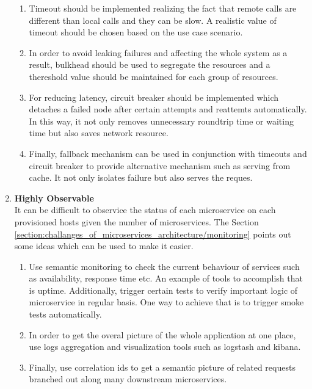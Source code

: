 \begin{enumerate}
\begin{enumerate}
\item Timeout should be implemented realizing the fact that remote calls are different than local calls and they can be slow. A realistic value of timeout should be chosen based on the use case scenario.
\item In order to avoid leaking failures and affecting the whole system as a result, bulkhead should be used to segregate the resources and a thereshold value should be maintained for each group of resources.
\item For reducing latency, circuit breaker should be implemented which detaches a failed node after certain attempts and reattemts automatically. In this way, it not only removes unnecessary roundtrip time or waiting time but also saves network resource.
\item Finally, fallback mechanism can be used in conjunction with timeouts and circuit breaker to provide alternative mechanism such as serving from cache. It not only isolates failure but also serves the reques.
\end{enumerate}
\item \textbf{Highly Observable} \\
It can be difficult to observice the status of each microservice on each provisioned hosts given the number of microservices. The Section \ref{section:challanges_of_microservices_architecture/monitoring} points out some ideas which can be used to make it easier.
\begin{enumerate}
\item Use semantic monitoring to check the current behaviour of services such as availability, response time etc. An example of tools to accomplish that is uptime. Additionally, trigger certain tests to verify important logic of microservice in regular basis. One way to achieve that is to trigger smoke tests automatically.
\item In order to get the overal picture of the whole application at one place, use logs aggregation and visualization tools such as logstash and kibana.
\item Finally, use correlation ids to get a semantic picture of related requests branched out along many downstream microservices.
\end{enumerate}
\end{enumerate}